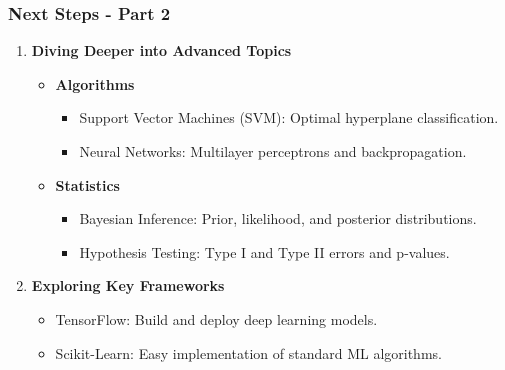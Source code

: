 \documentclass[aspectratio=169]{beamer}
\begin{document}
\begin{frame}[fragile]
    \frametitle{Next Steps - Part 2}
    \begin{enumerate}
        \item \textbf{Diving Deeper into Advanced Topics}
            \begin{itemize}
                \item \textbf{Algorithms}
                \begin{itemize}
                    \item Support Vector Machines (SVM): Optimal hyperplane classification.
                    \item Neural Networks: Multilayer perceptrons and backpropagation.
                \end{itemize}
                \item \textbf{Statistics}
                \begin{itemize}
                    \item Bayesian Inference: Prior, likelihood, and posterior distributions.
                    \item Hypothesis Testing: Type I and Type II errors and p-values.
                \end{itemize}
            \end{itemize}
        \item \textbf{Exploring Key Frameworks}
            \begin{itemize}
                \item TensorFlow: Build and deploy deep learning models.
                \item Scikit-Learn: Easy implementation of standard ML algorithms.
            \end{itemize}
    \end{enumerate}
\end{frame}
\end{document}
